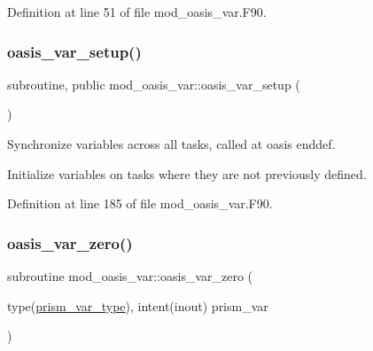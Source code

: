 Definition at line 51 of file mod\+\_\+oasis\+\_\+var.\+F90.

\mbox{\label{namespacemod__oasis__var_ab33b7fbec62bcfd15e9cd7f912f71035}} 
\subsubsection{\texorpdfstring{oasis\+\_\+var\+\_\+setup()}{oasis\_var\_setup()}}
{\footnotesize\ttfamily subroutine, public mod\+\_\+oasis\+\_\+var\+::oasis\+\_\+var\+\_\+setup (\begin{DoxyParamCaption}{ }\end{DoxyParamCaption})}



Synchronize variables across all tasks, called at oasis enddef. 


\begin{DoxyItemize}
\item Initialize variables on tasks where they are not previously defined. 
\end{DoxyItemize}

Definition at line 185 of file mod\+\_\+oasis\+\_\+var.\+F90.

\mbox{\label{namespacemod__oasis__var_aa780f62e9eded0a55d0077a990bf2443}} 
\subsubsection{\texorpdfstring{oasis\+\_\+var\+\_\+zero()}{oasis\_var\_zero()}}
{\footnotesize\ttfamily subroutine mod\+\_\+oasis\+\_\+var\+::oasis\+\_\+var\+\_\+zero (\begin{DoxyParamCaption}\item[{type(\hyperlink{structmod__oasis__var_1_1prism__var__type}{prism\+\_\+var\+\_\+type}), intent(inout)}]{prism\+\_\+var }\end{DoxyParamCaption})\hspace{0.3cm}{\ttfamily [private]}}



